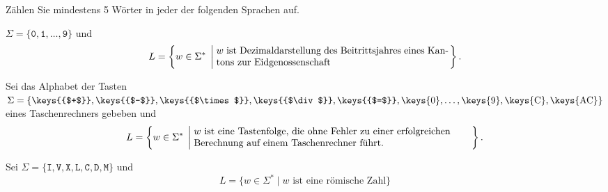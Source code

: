 Zählen Sie mindestens 5 Wörter in jeder der folgenden Sprachen auf.
\begin{teilaufgaben}
\item $\Sigma= \{\texttt{0},\texttt{1},\dots,\texttt{9}\}$ und
\[
L=\left\{ w\in\Sigma^*\;\left|\;
\begin{minipage}{8.4cm}
$w$ ist Dezimaldarstellung des Beitrittsjahres eines Kantons zur
Eidgenossenschaft
\end{minipage}
\right.\right\}.
\]
\item Sei das Alphabet der Tasten 
$\Sigma = \{
\text{\keys{{$+$}}},
\text{\keys{{$-$}}},
\text{\keys{{$\times$}}},
\text{\keys{{$\div$}}},
\text{\keys{{$=$}}},
\text{\keys{0}},
\dots,
\text{\keys{9}},
\text{\keys{C}},
\text{\keys{AC}}
\}
$
eines Taschenrechners gebeben und
\[
L=\left\{
w\in\Sigma^*\;
\left|
\;
\begin{minipage}{10cm}\raggedright
$w$ ist eine Tastenfolge, die ohne Fehler zu einer erfolgreichen Berechnung
auf einem Taschenrechner führt.
\end{minipage}
\right.
\right\}.
\]
\item
Sei $\Sigma = \{
\texttt{I},
\texttt{V},
\texttt{X},
\texttt{L},
\texttt{C},
\texttt{D},
\texttt{M}
\}$ und
\[
L=\{
w\in\Sigma^*\;
|
\;
\text{$w$ ist eine römische Zahl}
\}
\]
\end{teilaufgaben}


